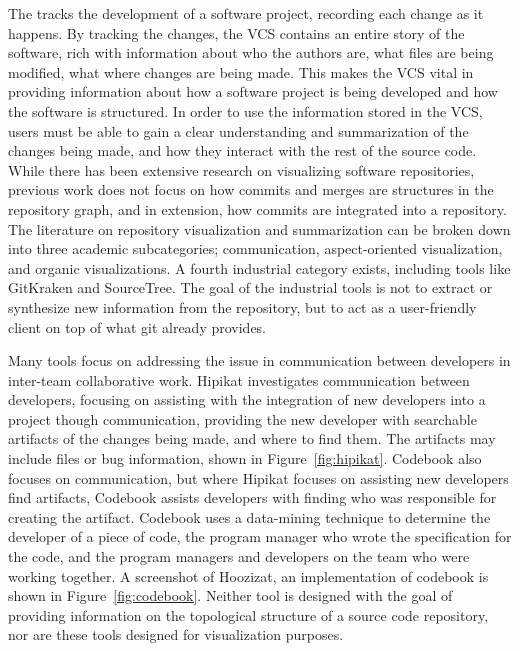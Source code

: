 The  tracks the development of a
software project, recording each change as it happens. By tracking the
changes, the VCS contains an entire story of the software, rich with
information about who the authors are, what files are being modified,
what where changes are being made. This makes the VCS vital in providing
information about how a software project is being developed and how the
software is structured. In order to use the information stored in the
VCS, users must be able to gain a clear understanding and summarization
of the changes being made, and how they interact with the rest of the
source code. While there has been extensive research on visualizing
software repositories, previous work does not focus on how commits and
merges are structures in the repository graph, and in extension, how
commits are integrated into a repository. The literature on repository
visualization and summarization can be broken down into three academic
subcategories; communication\cite{Cubranic2005,Begel2010},
aspect-oriented visualization\cite{Ambros2005,Burch2005,Ambros2009}, and
organic visualizations\cite{ogawa09,Caudwell2010}. A fourth industrial
category exists, including tools like GitKraken and SourceTree. The goal
of the industrial tools is not to extract or synthesize new information
from the repository, but to act as a user-friendly client on top of what
git already provides.

Many tools focus on addressing the issue in communication between
developers in inter-team collaborative work. Hipikat\cite{Cubranic2005}
investigates communication between developers, focusing on assisting
with the integration of new developers into a project though
communication, providing the new developer with searchable artifacts of
the changes being made, and where to find them. The artifacts may
include files or bug information, shown in Figure~\ref{fig:hipikat}.
Codebook\cite{Begel2010} also focuses on communication, but where
Hipikat focuses on assisting new developers find artifacts, Codebook
assists developers with finding who was responsible for creating the
artifact. Codebook uses a data-mining technique to determine the
developer of a piece of code, the program manager who wrote the
specification for the code, and the program managers and developers on
the team who were working together. A screenshot of Hoozizat, an
implementation of codebook is shown in Figure~\ref{fig:codebook}.
Neither tool is designed with the goal of providing information on the
topological structure of a source code repository, nor are these tools
designed for visualization purposes.

